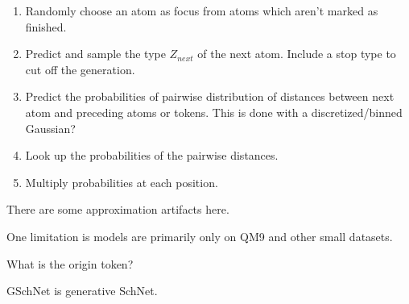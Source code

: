 \documentclass[book.tex]{subfiles}
\begin{document}
\begin{enumerate}
\item Randomly choose an atom as focus from atoms which aren't marked as finished.
\item Predict and sample the type $Z_{next}$ of the next atom. Include a stop type to cut off the generation.
\item Predict the probabilities of pairwise distribution of distances between next atom and preceding atoms or tokens. This is done with a discretized/binned Gaussian?
\item Look up the probabilities of the pairwise distances.
\item Multiply probabilities at each position.
\end{enumerate}

There are some approximation artifacts here.

One limitation is models are primarily only on QM9 and other small datasets.

What is the origin token?

GSchNet is generative SchNet.
\end{document}

